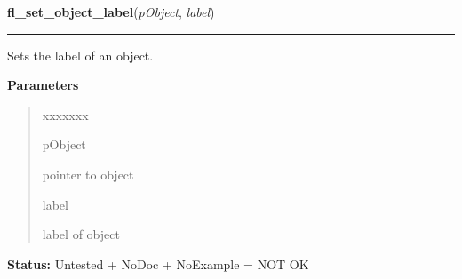 \hspace{.8\funcindent}\begin{boxedminipage}{\funcwidth}

    \raggedright \textbf{fl\_set\_object\_label}(\textit{pObject}, \textit{label})

    \vspace{-1.5ex}

    \rule{\textwidth}{0.5\fboxrule}
\setlength{\parskip}{2ex}
    Sets the label of an object.

\setlength{\parskip}{1ex}
      \textbf{Parameters}
      \vspace{-1ex}

      \begin{quote}
        \begin{Ventry}{xxxxxxx}

          \item[pObject]

          pointer to object

          \item[label]

          label of object

        \end{Ventry}

      \end{quote}

\textbf{Status:} Untested + NoDoc + NoExample = NOT OK



    \end{boxedminipage}

    \label{xformslib:library:fl_get_object_label}

    \vspace{0.5ex}

